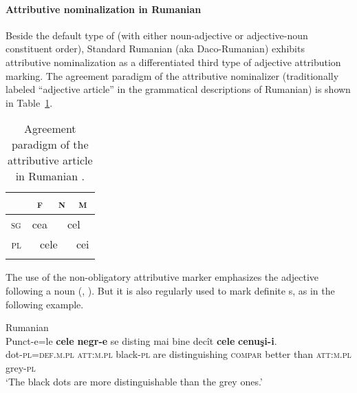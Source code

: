 \paragraph*{Attributive nominalization in Rumanian}\label{rumanian synchr}
Beside the default type of  (with either noun-adjective or adjective-noun constituent order), Standard Rumanian (aka Daco-Rumanian) exhibits attributive nominalization as a differentiated third type of adjective attribution marking. The agreement paradigm of the attributive nominalizer (traditionally labeled “adjective article” in the grammatical descriptions of Rumanian) is shown in Table~\ref{rumanian art}.
\begin{table}
\begin{tabular}{r c c c}
\lsptoprule		
			&\textsc{f}				&\textsc{n}		&\textsc{m}\\
\midrule
\textsc{sg}		&cea					&\multicolumn{2}{|c}{cel}\\
\midrule
\textsc{pl}		&\multicolumn{2}{c|}{cele}					&cei\\
\lspbottomrule
\end{tabular}
\caption[Article paradigm for Rumanian]{Agreement paradigm of the attributive article in Rumanian \citep[94]{beyer-etal1987}.
} \label{rumanian art}
\end{table}
The use of the non-obligatory attributive marker emphasizes the adjective following a noun (\citealt[94]{beyer-etal1987}, \citealt[148]{posner1996}). But it is also regularly used to mark definite s, as in the following example.
\begin{exe}
\ex \rm{Rumanian \citep[94]{beyer-etal1987}}\\ %
\gll Punct-e=le \textbf{cele} \textbf{negr-e} se disting mai bine decît \textbf{cele} \textbf{cenuşi-i}.\\
dot-\textsc{pl}=\textsc{def.m.pl} \textsc{att:m.pl} black-\textsc{pl} are distinguishing \textsc{compar} better than \textsc{att:m.pl} grey-\textsc{pl}\\
\glt ‘The black dots are more distinguishable than the grey ones.’
\end{exe}
